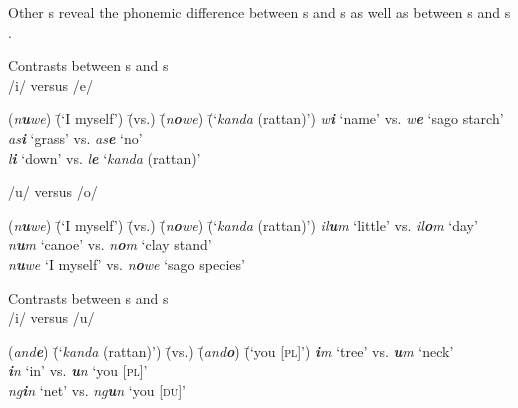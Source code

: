 Other s reveal the phonemic difference between s and s  as well as between s and s .

\ea%
    \label{ex:phon:46}
          Contrasts between s and s\\
    \ea  /i/ versus /e/\\
\begin{tabbing}
{(\textit{n\textbf{u}we})} \= {(‘I myself’)} \= {(vs.)} \= {(\textit{n\textbf{o}we})} \= {(‘\textit{kanda} (rattan)’)}\kill
{\textit{w\textbf{i}}} \> {‘name’} \> {vs.} \> {\textit{w\textbf{e}}} \> {‘sago starch’}\\
{\textit{as\textbf{i}}} \> {‘grass’} \> {vs.} \> {\textit{as\textbf{e}}} \> {‘no’}\\
{\textit{l\textbf{i}}} \> {‘down’} \> {vs.} \> {\textit{l\textbf{e}}} \> {‘\textit{kanda} (rattan)’}
\end{tabbing}

    \ex  /u/ versus /o/\\
\begin{tabbing}
{(\textit{n\textbf{u}we})} \= {(‘I myself’)} \= {(vs.)} \= {(\textit{n\textbf{o}we})} \= {(‘\textit{kanda} (rattan)’)}\kill
{\textit{il\textbf{u}m}} \> {‘little’} \> {vs.} \> {\textit{il\textbf{o}m}} \> {‘day’}\\
{\textit{n\textbf{u}m}} \> {‘canoe’} \> {vs.} \> {\textit{n\textbf{o}m}} \> {‘clay stand’}\\
{\textit{n\textbf{u}we}} \> {‘I myself’} \> {vs.} \> {\textit{n\textbf{o}we}} \> {‘sago species’}
\end{tabbing}
\z
\z

\ea%
    \label{ex:phon:47}
          Contrasts between s and s\\
    \ea  /i/ versus /u/\\
\begin{tabbing}
{(\textit{and\textbf{e}})} \= {(‘\textit{kanda} (rattan)’)} \= {(vs.)} \= {(\textit{and\textbf{o}})} \= {(‘you [\textsc{pl}]’)}\kill
{\textit{\textbf{i}m}} \> {‘tree’} \> {vs.} \> {\textit{\textbf{u}m}} \> {‘neck’}\\
{\textit{\textbf{i}n}} \> {‘in’} \> {vs.} \> {\textit{\textbf{u}n}} \> {‘you [\textsc{pl}]’}\\
{\textit{ng\textbf{i}n}} \> {‘net’} \> {vs.} \> {\textit{ng\textbf{u}n}} \> {‘you [\textsc{du}]’}
\end{tabbing}


